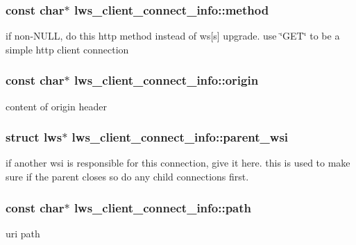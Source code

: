 \subsubsection[{\texorpdfstring{method}{method}}]{\setlength{\rightskip}{0pt plus 5cm}const char$\ast$ lws\+\_\+client\+\_\+connect\+\_\+info\+::method}\hypertarget{structlws__client__connect__info_aa9e8e3da4e783a0651b0dea62c2dd1db}{}\label{structlws__client__connect__info_aa9e8e3da4e783a0651b0dea62c2dd1db}
if non-\/\+N\+U\+LL, do this http method instead of ws\mbox{[}s\mbox{]} upgrade. use \char`\"{}\+G\+E\+T\char`\"{} to be a simple http client connection 
\subsubsection[{\texorpdfstring{origin}{origin}}]{\setlength{\rightskip}{0pt plus 5cm}const char$\ast$ lws\+\_\+client\+\_\+connect\+\_\+info\+::origin}\hypertarget{structlws__client__connect__info_a8595f83e64147cb687b6418cf500dd4c}{}\label{structlws__client__connect__info_a8595f83e64147cb687b6418cf500dd4c}
content of origin header 
\subsubsection[{\texorpdfstring{parent\+\_\+wsi}{parent\_wsi}}]{\setlength{\rightskip}{0pt plus 5cm}struct lws$\ast$ lws\+\_\+client\+\_\+connect\+\_\+info\+::parent\+\_\+wsi}\hypertarget{structlws__client__connect__info_a6843a60e1050b10db9d98d7eeb45f587}{}\label{structlws__client__connect__info_a6843a60e1050b10db9d98d7eeb45f587}
if another wsi is responsible for this connection, give it here. this is used to make sure if the parent closes so do any child connections first. 
\subsubsection[{\texorpdfstring{path}{path}}]{\setlength{\rightskip}{0pt plus 5cm}const char$\ast$ lws\+\_\+client\+\_\+connect\+\_\+info\+::path}\hypertarget{structlws__client__connect__info_a76a8388733f114fb8fd3643874781185}{}\label{structlws__client__connect__info_a76a8388733f114fb8fd3643874781185}
uri path 
